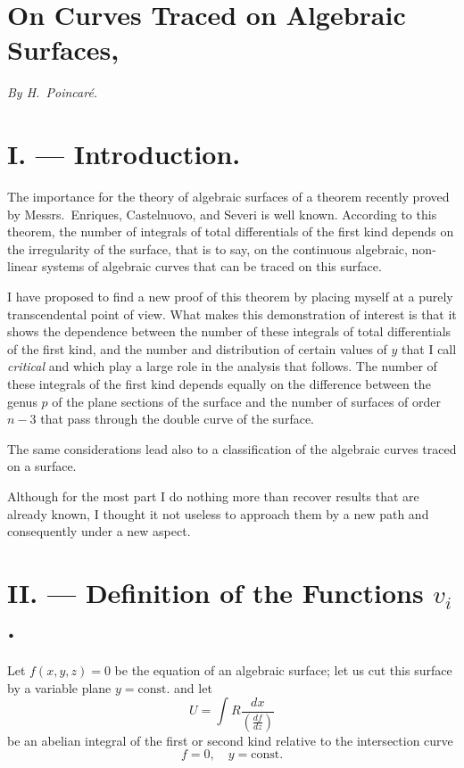 \documentclass{article}
\begin{document}
\section*{On Curves Traced on Algebraic Surfaces,}

\begin{center}
\emph{By H.~Poincaré.}
\end{center}

\section*{I. --- Introduction.}

The importance for the theory of algebraic surfaces of a theorem recently proved by Messrs.~Enriques, Castelnuovo, and Severi is well known. According to this theorem, the number of integrals of total differentials of the first kind depends on the irregularity of the surface, that is to say, on the continuous algebraic, non-linear systems of algebraic curves that can be traced on this surface.

I have proposed to find a new proof of this theorem by placing myself at a purely transcendental point of view. What makes this demonstration of interest is that it shows the dependence between the number of these integrals of total differentials of the first kind, and the number and distribution of certain values of $y$ that I call \emph{critical} and which play a large role in the analysis that follows. The number of these integrals of the first kind depends equally on the difference between the genus $p$ of the plane sections of the surface and the number of surfaces of order $n - 3$ that pass through the double curve of the surface.

The same considerations lead also to a classification of the algebraic curves traced on a surface.

Although for the most part I do nothing more than recover results that are already known, I thought it not useless to approach them by a new path and consequently under a new aspect.

\section*{II. --- Definition of the Functions $v_i$.}

Let $f(x, y, z) = 0$ be the equation of an algebraic surface; let us cut this surface by a variable plane $y = \text{const.}$ and let
\[
U = \int R \frac{dx}{\left(\frac{df}{dz}\right)} \tag{1}
\]
be an abelian integral of the first or second kind relative to the intersection curve
\[
f = 0, \quad y = \text{const.} \tag{2}
\]
\end{document}
